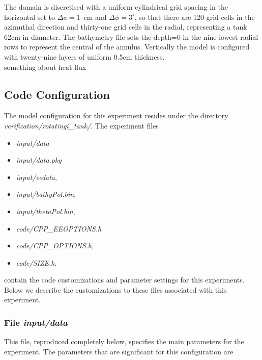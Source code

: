  The domain is discretised with a uniform cylindrical grid spacing in
the horizontal set to $\Delta a=1$~cm and $\Delta \phi=3^{\circ}$, so
that there are 120 grid cells in the azimuthal direction and
thirty-one grid cells in the radial, representing a tank 62cm in
diameter.  The bathymetry file sets the depth=0 in the nine lowest
radial rows to represent the central of the annulus.  Vertically the
model is configured with twenty-nine layers of uniform 0.5cm
thickness.
\\
something about heat flux

\subsection{Code Configuration}
\label{sec:eg-tank-code_config}

The model configuration for this experiment resides under the
directory {\it verification/rotatingi\_tank/}.  The experiment files
\begin{itemize}
\item {\it input/data}
\item {\it input/data.pkg}
\item {\it input/eedata},
\item {\it input/bathyPol.bin},
\item {\it input/thetaPol.bin},
\item {\it code/CPP\_EEOPTIONS.h}
\item {\it code/CPP\_OPTIONS.h},
\item {\it code/SIZE.h}.
\end{itemize}

contain the code customizations and parameter settings for this 
experiments. Below we describe the customizations
to these files associated with this experiment.

\subsubsection{File {\it input/data}}

This file, reproduced completely below, specifies the main parameters 
for the experiment. The parameters that are significant for this configuration
are

